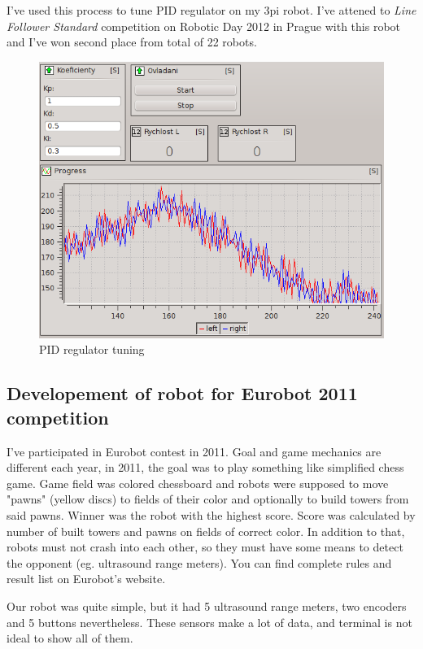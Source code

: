 \documentclass[12pt, a4paper, oneside]{article}
\newcommand{\It}{\textit}  %
\begin{document}
I've used this process to tune PID regulator on my 3pi\cite{3pi} robot. I've attened to \It{Line Follower Standard} competition on Robotic Day 2012 in Prague\cite{rob_den} with this robot and I've won second place from total of 22 robots.

\begin{figure}[H]
\begin{center}
\includegraphics[scale=0.55]{img/use_pid.png}
\caption{PID regulator tuning}
\end{center}
\end{figure}

\newpage
\subsection{Developement of robot for Eurobot 2011 competition}
I've participated in Eurobot\cite{eurobot} contest in 2011. Goal and game mechanics are different each year, in 2011, the goal was to play something like simplified chess game. Game field was colored chessboard and robots were supposed to move "pawns" (yellow discs) to fields of their color and optionally to build towers from said pawns. Winner was the robot with the highest score. Score was calculated by number of built towers and pawns on fields of correct color. In addition to that, robots must not crash into each other, so they must have some means to detect the opponent (eg. ultrasound range meters). You can find complete rules and result list on Eurobot's website\cite{eurobot11}.

Our robot was quite simple, but it had 5 ultrasound range meters, two encoders and 5 buttons nevertheless. These sensors make a lot of data, and terminal is not ideal to show all of them.
\end{document}
